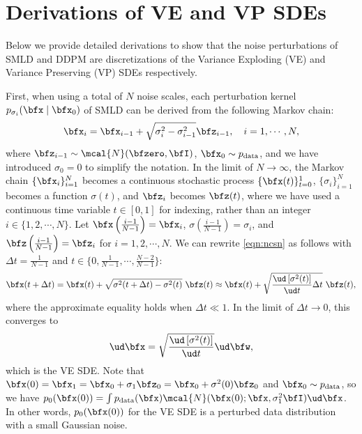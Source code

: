 \section{Derivations of VE and VP SDEs}\label{app:sde_derive}
Below we provide detailed derivations to show that the noise perturbations of SMLD and DDPM are discretizations of the Variance Exploding (VE) and Variance Preserving (VP) SDEs respectively.

First, when using a total of $N$ noise scales, each perturbation kernel $p_{\sigma_i}(\bfx \mid \bfx_0)$ of SMLD can be derived from the following Markov chain:
\begin{align}
\bfx_i = \bfx_{i-1} + \sqrt{\sigma_{i}^2 - \sigma_{i-1}^2} \bfz_{i-1}, \quad i=1,\cdots,N \label{eqn:ncsn},
\end{align}
where $\bfz_{i-1} \sim \mcal{N}(\bfzero, \bfI)$, $\bfx_0 \sim p_\text{data}$, and we have introduced $\sigma_0 = 0$ to simplify the notation.
In the limit of $N \to \infty$, the Markov chain $\{\bfx_i\}_{i=1}^N$ becomes a continuous stochastic process $\{\bfx(t)\}_{t=0}^1$, $\{\sigma_i\}_{i=1}^N$ becomes a function $\sigma(t)$, and $\bfz_i$ becomes $\bfz(t)$, where we have used a continuous time variable $t \in [0, 1]$ for indexing, rather than an integer $i \in \{1, 2, \cdots, N\}$. 
Let $\bfx\left(\frac{i-1}{N-1}\right) = \bfx_i$, $\sigma\left(\frac{i-1}{N-1}\right) = \sigma_i$, and $\bfz\left(\frac{i-1}{N-1}\right) = \bfz_i$ for $i=1,2,\cdots, N$. We can rewrite \cref{eqn:ncsn} as follows with $\Delta t = \frac{1}{N-1}$ and $t \in \big\{0, \frac{1}{N-1}, \cdots, \frac{N-2}{N-1}\big\}$:
\begin{align*}
    \bfx(t + \Delta t) = \bfx(t) + \sqrt{\sigma^2(t + \Delta t)- \sigma^2(t)}~\bfz(t) \approx \bfx(t) + \sqrt{\frac{\ud \left[ \sigma^2(t) \right] }{\ud t}\Delta t} ~\bfz(t),
\end{align*}
where the approximate equality holds when $\Delta t \ll 1$. 
In the limit of $\Delta t \rightarrow 0$, this converges to
\begin{align}
\ud \bfx = \sqrt{\frac{\ud \left[ \sigma^2(t) \right]}{\ud t}}\ud \bfw, \label{eqn:ncsn_sde_2}
\end{align}
which is the VE SDE. Note that $\bfx(0) = \bfx_1 = \bfx_0 + \sigma_1 \bfz_0 = \bfx_0 + \sigma^2(0) \bfz_0$ and $\bfx_0 \sim p_\text{data}$, so we have $p_0(\bfx(0)) = \int p_\text{data}(\bfx) \mcal{N}(\bfx(0); \bfx, \sigma_1^2 \bfI) \ud \bfx$. In other words, $p_0(\bfx(0))$ for the VE SDE is a perturbed data distribution with a small Gaussian noise.

